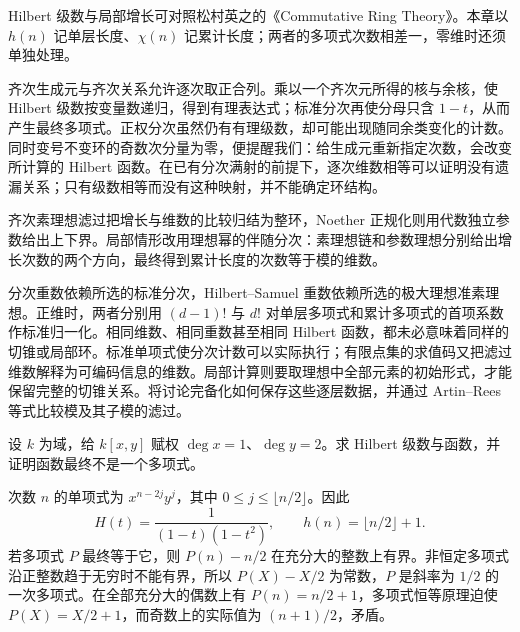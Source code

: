 \ProseParagraphBreak
Hilbert 级数与局部增长可对照松村英之的《Commutative Ring Theory》\cite[\S13, Theorems 13.2--13.4, pp. 94--100]{Matsumura1989CommutativeRingTheory}。本章以 \(h(n)\) 记单层长度、\(\chi(n)\) 记累计长度；两者的多项式次数相差一，零维时还须单独处理。






\begin{chaptersummary}
	齐次生成元与齐次关系允许逐次取正合列。乘以一个齐次元所得的核与余核，使 Hilbert 级数按变量数递归，得到有理表达式；标准分次再使分母只含 \(1-t\)，从而产生最终多项式。正权分次虽然仍有有理级数，却可能出现随同余类变化的计数。同时变号不变环的奇数次分量为零，便提醒我们：给生成元重新指定次数，会改变所计算的 Hilbert 函数。在已有分次满射的前提下，逐次维数相等可以证明没有遗漏关系；只有级数相等而没有这种映射，并不能确定环结构。

	\ProseParagraphBreak
	齐次素理想滤过把增长与维数的比较归结为整环，Noether 正规化则用代数独立参数给出上下界。局部情形改用理想幂的伴随分次：素理想链和参数理想分别给出增长次数的两个方向，最终得到累计长度的次数等于模的维数。

	\ProseParagraphBreak
	分次重数依赖所选的标准分次，Hilbert–Samuel 重数依赖所选的极大理想准素理想。正维时，两者分别用 \((d-1)!\) 与 \(d!\) 对单层多项式和累计多项式的首项系数作标准归一化。相同维数、相同重数甚至相同 Hilbert 函数，都未必意味着同样的切锥或局部环。标准单项式使分次计数可以实际执行；有限点集的求值码又把滤过维数解释为可编码信息的维数。局部计算则要取理想中全部元素的初始形式，才能保留完整的切锥关系。将讨论完备化如何保存这些逐层数据，并通过 Artin–Rees 等式比较模及其子模的滤过。
\end{chaptersummary}

\BookExercises

\begin{exercise}\label{b3:ex:11-weighted-count}
	设 \(k\) 为域，给 \(k[x,y]\) 赋权 \(\deg x=1\)、\(\deg y=2\)。求 Hilbert 级数与函数，并证明函数最终不是一个多项式。
\end{exercise}
\begin{solution}
	次数 \(n\) 的单项式为 \(x^{n-2j}y^j\)，其中 \(0\le j\le\lfloor n/2\rfloor\)。因此
	\[
		H(t)=\dfrac1{(1-t)(1-t^2)},\qquad h(n)=\lfloor n/2\rfloor+1.
	\]
	若多项式 \(P\) 最终等于它，则 \(P(n)-n/2\) 在充分大的整数上有界。非恒定多项式沿正整数趋于无穷时不能有界，所以 \(P(X)-X/2\) 为常数，\(P\) 是斜率为 \(1/2\) 的一次多项式。在全部充分大的偶数上有 \(P(n)=n/2+1\)，多项式恒等原理迫使 \(P(X)=X/2+1\)，而奇数上的实际值为 \((n+1)/2\)，矛盾。
\end{solution}

